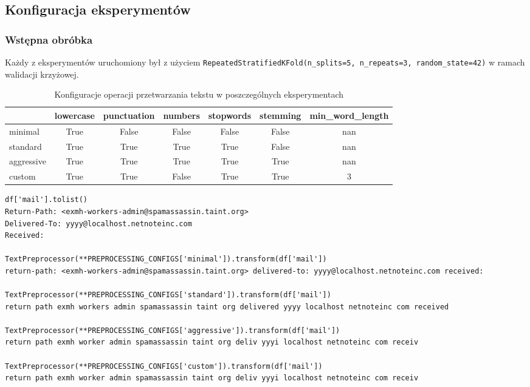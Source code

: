 \documentclass{article}
\begin{document}
\subsection{Konfiguracja eksperymentów}

\subsubsection{Wstępna obróbka}

Każdy z eksperymentów uruchomiony był z użyciem \texttt{RepeatedStratifiedKFold(n\_splits=5, n\_repeats=3, random\_state=42)} w ramach walidacji krzyżowej.


\begin{table}[h!]
\centering
\begin{tabular}{|l|c|c|c|c|c|c|}
\hline
\textbf{} & \textbf{lowercase} & \textbf{punctuation} & \textbf{numbers} & \textbf{stopwords} & \textbf{stemming} & \textbf{min\_word\_length} \\
\hline
minimal     & True  & False & False & False & False & nan \\
standard    & True  & True  & True  & True  & False & nan \\
aggressive  & True  & True  & True  & True  & True  & nan \\
custom      & True  & True  & False & True  & True  & 3   \\
\hline
\end{tabular}
\caption{Konfiguracje operacji przetwarzania tekstu w poszczególnych eksperymentach}
\end{table}

{\scriptsize
\begin{verbatim}
df['mail'].tolist()
Return-Path: <exmh-workers-admin@spamassassin.taint.org>
Delivered-To: yyyy@localhost.netnoteinc.com
Received:

TextPreprocessor(**PREPROCESSING_CONFIGS['minimal']).transform(df['mail'])
return-path: <exmh-workers-admin@spamassassin.taint.org> delivered-to: yyyy@localhost.netnoteinc.com received:

TextPreprocessor(**PREPROCESSING_CONFIGS['standard']).transform(df['mail'])
return path exmh workers admin spamassassin taint org delivered yyyy localhost netnoteinc com received 

TextPreprocessor(**PREPROCESSING_CONFIGS['aggressive']).transform(df['mail'])
return path exmh worker admin spamassassin taint org deliv yyyi localhost netnoteinc com receiv

TextPreprocessor(**PREPROCESSING_CONFIGS['custom']).transform(df['mail'])
return path exmh worker admin spamassassin taint org deliv yyyi localhost netnoteinc com receiv
\end{verbatim}
}
\end{document}
